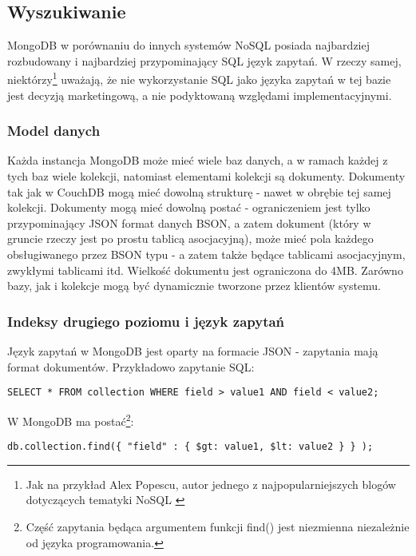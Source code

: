 \subsection*{Wyszukiwanie}

MongoDB w porównaniu do innych systemów NoSQL posiada najbardziej rozbudowany i najbardziej przypominający SQL język zapytań.
W rzeczy samej, niektórzy\footnote{Jak na przykład Alex Popescu, autor jednego z najpopularniejszych blogów dotyczących tematyki NoSQL \cite{popescu-mongodb-sql}} uważają, że nie wykorzystanie SQL jako języka zapytań w tej bazie jest decyzją marketingową, a nie podyktowaną względami implementacyjnymi.

\subsubsection*{Model danych}

Każda instancja MongoDB może mieć wiele baz danych, a w ramach każdej z tych baz wiele kolekcji, natomiast elementami kolekcji są dokumenty.
Dokumenty tak jak w CouchDB mogą mieć dowolną strukturę - nawet w obrębie tej samej kolekcji.
Dokumenty mogą mieć dowolną postać - ograniczeniem jest tylko przypominający JSON format danych BSON, a zatem dokument (który w gruncie rzeczy jest po prostu tablicą asocjacyjną), może mieć pola każdego obsługiwanego przez BSON typu - a zatem także będące tablicami asocjacyjnym, zwykłymi tablicami itd.
Wielkość dokumentu jest ograniczona do 4MB.
Zarówno bazy, jak i kolekcje mogą być dynamicznie tworzone przez klientów systemu.

\subsubsection*{Indeksy drugiego poziomu i język zapytań}

Język zapytań w MongoDB jest oparty na formacie JSON - zapytania mają format dokumentów. Przykładowo zapytanie SQL:

\begin{verbatim}
SELECT * FROM collection WHERE field > value1 AND field < value2;
\end{verbatim}

W MongoDB ma postać\footnote{Część zapytania będąca argumentem funkcji find() jest niezmienna niezależnie od języka programowania.}:

\begin{verbatim}
db.collection.find({ "field" : { $gt: value1, $lt: value2 } } );
\end{verbatim}


